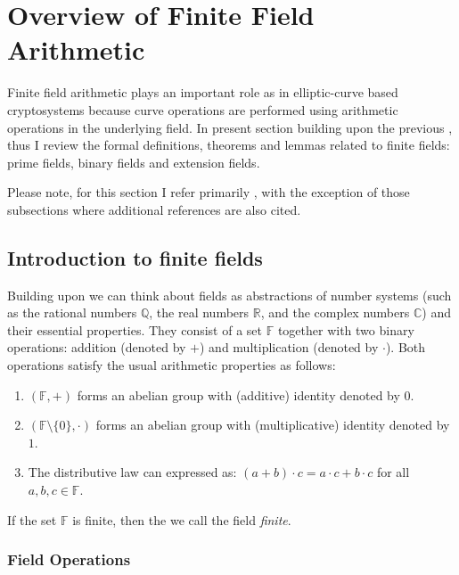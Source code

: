 
\section{Overview of Finite Field Arithmetic}
\label{sec:ch01.finiteFieldArithmetic}

Finite field arithmetic plays an important role as in elliptic-curve based cryptosystems because curve operations  are performed using arithmetic operations in the underlying field.  In present section building upon the previous , thus I review the formal definitions, theorems and lemmas related to finite fields: prime fields, binary fields and extension fields. 

Please note, for this section I refer primarily \cite{menezes2004ECC}, with the exception of those subsections where additional references are also cited. 


\subsection{Introduction to finite fields}
\label{ssec:ch1.introtofinitefields}
Building upon  we can think about fields as abstractions of  number systems (such as the rational numbers $\mathbb{Q}$, the real numbers $\mathbb{R}$, and the complex numbers $\mathbb{C}$) and their essential properties. They consist of a set $\mathbb{F}$ together with two binary operations: addition (denoted by $+$) and multiplication (denoted by $\cdot$). Both operations satisfy the usual arithmetic properties as follows:

\begin{enumerate}
	\item $(\mathbb{F}, +)$ forms an abelian group with (additive) identity denoted by $0$.
	\item $(\mathbb{F} \setminus \{0\}, \cdot)$ forms an abelian group with (multiplicative) identity denoted by $1$.
	\item The distributive law can expressed as: $(a + b) \cdot c = a \cdot c + b \cdot c$ for all $a, b, c \in \mathbb{F}$.
\end{enumerate}

If the set $\mathbb{F}$ is finite, then the we call the field \textit{finite}.

\subsubsection{Field Operations}
\label{sssec:ch01.fieldOperations}


